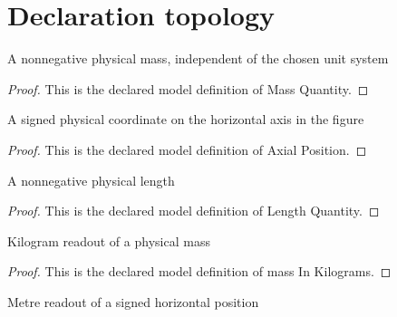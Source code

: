 \section{Declaration topology}
\begin{definition}
  \label{def:physics:phyx-mini-0817:phyxminiproblems-problemphyxmini0817-massquantity}
  A nonnegative physical mass, independent of the chosen unit system
\end{definition}
\begin{proof}
  This is the declared model definition of Mass Quantity.
\end{proof}
\begin{definition}
  \label{def:physics:phyx-mini-0817:phyxminiproblems-problemphyxmini0817-axialposition}
  A signed physical coordinate on the horizontal axis in the figure
\end{definition}
\begin{proof}
  This is the declared model definition of Axial Position.
\end{proof}
\begin{definition}
  \label{def:physics:phyx-mini-0817:phyxminiproblems-problemphyxmini0817-lengthquantity}
  A nonnegative physical length
\end{definition}
\begin{proof}
  This is the declared model definition of Length Quantity.
\end{proof}
\begin{definition}
  \label{def:physics:phyx-mini-0817:phyxminiproblems-problemphyxmini0817-massinkilograms}
  Kilogram readout of a physical mass
\end{definition}
\begin{proof}
  This is the declared model definition of mass In Kilograms.
\end{proof}
\begin{definition}
  \label{def:physics:phyx-mini-0817:phyxminiproblems-problemphyxmini0817-positioninmeters}
  Metre readout of a signed horizontal position
\end{definition}
